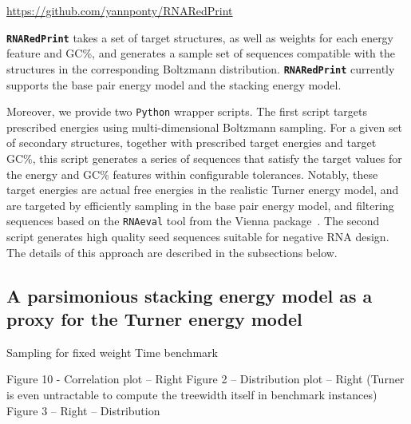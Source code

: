 \documentclass[]{bmcart}
\newcommand{\Nuc}[1]{{\sf #1}}
\newcommand{\Cb}{\Nuc{C}}
\newcommand{\Gb}{\Nuc{G}}
\newcommand{\GCb}{\Gb\Cb}
\newcommand{\ourprog}{{\tt \bfseries{}\color{black!85}RNA\textcolor{red!70!black}{Red}Print}}
\begin{document}
{\centering \url{https://github.com/yannponty/RNARedPrint}\\[.3em]}%

\ourprog{}  takes a set of target structures, as well as
weights for each energy feature and \GCb\%, and generates a sample set of sequences compatible with the structures in the corresponding
Boltzmann distribution. \ourprog{} currently supports the base pair
energy model and the stacking energy model.

Moreover, we provide two {\tt Python} wrapper scripts. The first script targets prescribed energies using multi-dimensional Boltzmann sampling.
For a given set of secondary structures, together with prescribed target energies
and target \GCb\%, this script generates a series of sequences that satisfy the target values for the energy and
\GCb\% features within configurable tolerances.
Notably, these target energies are actual free energies in the realistic
Turner energy model, and are targeted by efficiently sampling in the
base pair energy model, and filtering sequences based on the {\tt RNAeval} tool from the Vienna package~\cite{Lorenz2011}. The second script generates high quality seed sequences suitable for negative RNA design. The details of this approach are described in the subsections below.

\subsection*{A parsimonious stacking energy model as a proxy for the Turner energy model}
Sampling for fixed weight
Time benchmark

Figure 10 - Correlation plot -- Right
Figure 2 -- Distribution plot -- Right (Turner is even untractable to compute the treewidth itself in benchmark instances)
Figure 3 -- Right -- Distribution 
\end{document}
